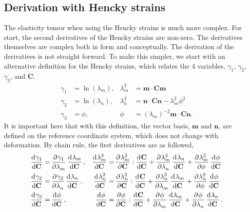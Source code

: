 \subsection{Derivation with Hencky strains}

	The elasticity tensor when using the Hencky strains is much more complex. For start, the second derivatives of the Hencky strains are non-zero. The derivatives themselves are complex both in form and conceptually. The derivation of the derivatives is not straight forward. To make this simpler, we start with an alternative definition for the Hencky strains, which relates the 4 variables, $\gamma_1$, $\gamma_2$, $\gamma_3$, and $\mathbf{C}$.  
\begin{equation}\label{eqn:invariantset}
\begin{aligned}
    \gamma_1 &= \ln \left( \lambda_m \right), &  \lambda_m^2 &= \mathbf{m}\cdot\mathbf{C}\mathbf{m}  \\
    \gamma_2 &= \ln \left( \lambda_n \right), &  \lambda_n^2 &= \mathbf{n}\cdot\mathbf{C}\mathbf{n} 
                    - \lambda_m^2 \phi^2   \\
    \gamma_3 &= \phi, & \phi &= \left( \lambda_m\right)^{-2}\mathbf{m}\cdot\mathbf{C}\mathbf{n}.
\end{aligned}
\end{equation}
It is important here that with this definition, the vector basis, $\mathbf{m}$ and $\mathbf{n}$, are defined on the reference coordinate system, which does not change with deformation. By chain rule, the first derivatives are as followed,
\begin{subequations}
\begin{align}
\dod{\gamma_1}{\mathbf{C}} =& \dpd{\gamma_1}{\lambda_m}\dod{\lambda_m}{\mathbf{C}},	
	& \dod{\lambda_m^2}{\mathbf{C}} =& \dpd{\lambda_m^2}{\mathbf{C}}:\dod{\mathbf{C}}{\mathbf{C}} 
	+ \dpd{\lambda_m^2}{\lambda_n}\dod{\lambda_n}{\mathbf{C}}
    + \dpd{\lambda_m^2}{\phi}\dod{\phi}{\mathbf{C}} \\
\dod{\gamma_2}{\mathbf{C}} =& \dpd{\gamma_2}{\lambda_n}\dod{\lambda_n}{\mathbf{C}},	
	& \dod{\lambda_n^2}{\mathbf{C}} =& \dpd{\lambda_n^2}{\mathbf{C}}:\dod{\mathbf{C}}{\mathbf{C}} 
	+ \dpd{\lambda_n^2}{\lambda_m}\dod{\lambda_m}{\mathbf{C}}
    + \dpd{\lambda_n^2}{\phi}\dod{\phi}{\mathbf{C}} \\
\dod{\gamma_3}{\mathbf{C}} =& \dod{\phi}{\mathbf{C}},
	& \dod{\phi}{\mathbf{C}} =& \dpd{\phi}{\mathbf{C}}:\dod{\mathbf{C}}{\mathbf{C}} 
	+ \dpd{\phi}{\lambda_m}\dod{\lambda_m}{\mathbf{C}}
    + \dpd{\phi}{\lambda_n}\dod{\lambda_n}{\mathbf{C}}. 
\end{align}
\end{subequations}

